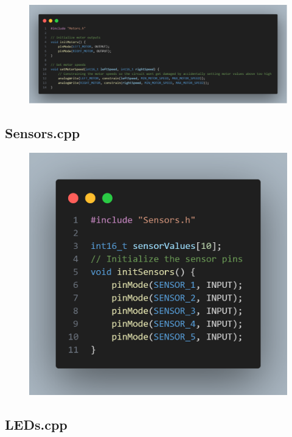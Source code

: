 \begin{figure}[H]
    \centering
    \includegraphics[width=0.8\linewidth]{REPORT/Motorscode.png}
\end{figure}

\subsection{Sensors.cpp}

\begin{figure}[H]
    \centering
    \includegraphics[width=0.8\linewidth]{REPORT/sensorscode.png}
\end{figure}

\subsection{LEDs.cpp}

